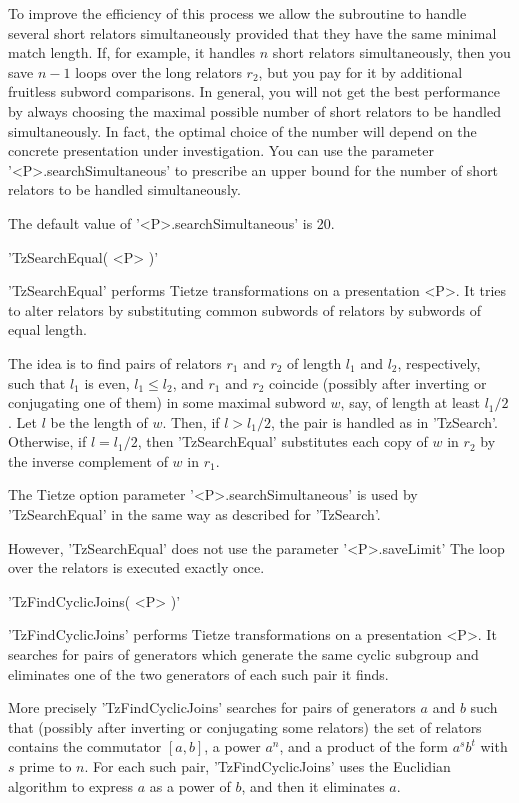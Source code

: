 To improve  the efficiency  of this  process  we  allow the subroutine to
handle several short relators simultaneously provided that they  have the
same  minimal  match  length.   If,  for example,  it  handles  $n$ short
relators simultaneously,  then you save  $n  -  1$ loops  over  the  long
relators $r_2$,  but  you  pay  for  it by  additional fruitless  subword
comparisons.  In general, you will not get the best performance by always
choosing the maximal  possible number of  short  relators  to  be handled
simultaneously.  In fact, the optimal choice of the number will depend on
the concrete presentation under investigation.  You can use the parameter
'<P>.searchSimultaneous' to prescribe  an upper  bound for the  number of
short relators to be handled simultaneously.

The default value of '<P>.searchSimultaneous' is 20.

\vspace{5mm}
'TzSearchEqual( <P> )'%

'TzSearchEqual'  performs Tietze transformations on a  presentation  <P>.
It tries to alter relators by substituting common subwords of relators by
subwords of equal length.

The idea is to find pairs of relators $r_1$ and $r_2$ of length $l_1$ and
$l_2$, respectively, such that $l_1$ is  even, $l_1  \le l_2$, and  $r_1$
and $r_2$ coincide (possibly after inverting or conjugating one  of them)
in some maximal subword $w$, say, of length at least $l_1/2$.  Let $l$ be
the  length of  $w$.   Then, if  $l > l_1/2$,  the pair is  handled as in
'TzSearch'.  Otherwise, if $l  = l_1/2$, then 'TzSearchEqual' substitutes
each copy of $w$ in $r_2$ by the inverse complement of $w$ in $r_1$.

The  Tietze  option   parameter   '<P>.searchSimultaneous'  is   used  by
'TzSearchEqual' in the same way as described for 'TzSearch'.

However, 'TzSearchEqual' does  not use the  parameter '<P>.saveLimit'{\:}
The loop over the relators is executed exactly once.

\vspace{5mm}
'TzFindCyclicJoins( <P> )'%

'TzFindCyclicJoins' performs  Tietze transformations  on  a  presentation
<P>.  It searches  for pairs of generators which generate the same cyclic
subgroup and eliminates  one of  the two generators of each such pair  it
finds.

More precisely{\:}  'TzFindCyclicJoins'  searches for pairs of generators
$a$  and  $b$ such that (possibly  after inverting  or  conjugating  some
relators)  the set of relators  contains the  commutator $[a,b]$, a power
$a^n$, and  a  product  of the form $a^s b^t$ with $s$ prime to $n$.  For
each  such  pair, 'TzFindCyclicJoins'  uses  the  Euclidian algorithm  to
express $a$ as a power of $b$, and then it eliminates $a$.

